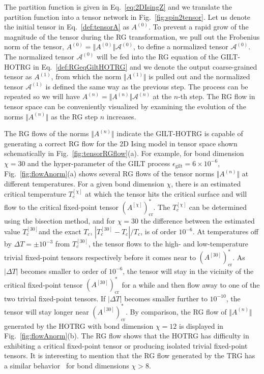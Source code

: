 \documentclass[aps,prr,reprint,superscriptaddress,floatfix]{revtex4-2}
\begin{document}
The partition function is given in Eq.~\eqref{eq:2DIsingZ} and we translate the partition function into a tensor network in Fig.~\ref{fig:spin2tensor}. 
Let us denote the initial tensor in Eq.~\eqref{def:tensorA} as $A^{(0)}$. 
To prevent a rapid grow of the magnitude of the tensor during the RG transformation, we pull out the Frobenius norm of the tensor, $A^{(0)} = \Vert A^{(0)}\Vert \mathcal{A}^{(0)}$, to define a normalized tensor $\mathcal{A}^{(0)}$. 
The normalized tensor $\mathcal{A}^{(0)}$ will be fed into the RG equation of the GILT-HOTRG in Eq.~\eqref{def:RGeqGiltHOTRG} and we denote the output coarse-grained tensor as $A^{(1)}$, from which the norm $\Vert A^{(1)}\Vert$ is pulled out and the normalized tensor $\mathcal{A}^{(1)}$ is defined the same way as the previous step. 
The process can be repeated so we will have $A^{(n)} = \Vert A^{(n)}\Vert \mathcal{A}^{(n)}$ at the $n$-th step. 
The RG flow in tensor space can be conveniently visualized by examining the evolution of the norms $\Vert A^{(n)}\Vert$ as the RG step $n$ increases.
%

The RG flows of the norms $\Vert A^{(n)} \Vert$ indicate the GILT-HOTRG is capable of generating a correct RG flow for the 2D Ising model in tensor space shown schematically in Fig.~\ref{fig:tensorRGflow}(a). 
For example, for bond dimension $\chi = 30$ and the hyper-parameter of the GILT process $\epsilon_{\text{gilt}} = 6\times 10^{-6}$, Fig.~\ref{fig:flowAnorm}(a) shows several RG flows of the tensor norms $\Vert A^{(n)} \Vert$ at different temperatures. 
For a given bond dimension $\chi$, there is an estimated critical temperature $T_c^{[\chi]}$ at which the tensor hits the critical surface and will flow to the critical fixed-point tensor $(A^{[\chi]})^*_{\text{cr}}$. 
The $T_c^{[\chi]}$ can be determined using the bisection method, and for $\chi = 30$ the difference between the estimated value $T_c^{[30]}$and the exact $T_c$, $|T_c^{[30]} - T_c| / T_c$, is of order $10^{-6}$. 
At temperatures off by $\Delta T = \pm 10^{-3}$ from $T_c^{[30]}$, the tensor flows to the high- and low-temperature trivial fixed-point tensors respectively before it comes near to $(A^{[30]})^*_{\text{cr}}$. 
As $|\Delta T|$ becomes smaller to order of $10^{-6}$, the tensor will stay in the vicinity of the critical fixed-point tensor $(A^{[30]})^*_{\text{cr}}$ for a while and then flow away to one of the two trivial fixed-point tensors. 
If $|\Delta T|$ becomes smaller further to $10^{-10}$, the tensor will stay longer near $(A^{[30]})^*_{\text{cr}}$. 
By comparison, the RG flow of $\Vert A^{(n)}\Vert$ generated by the HOTRG with bond dimension $\chi = 12$ is displayed in Fig.~\ref{fig:flowAnorm}(b). 
The RG flow shows that the HOTRG has difficulty in exhibiting a critical fixed-point tensor or producing isolated trivial fixed-point tensors. 
It is interesting to mention that the RG flow generated by the TRG has a similar behavior~\cite{Berker2008} for bond dimensions $\chi > 8$.
%
\end{document}
